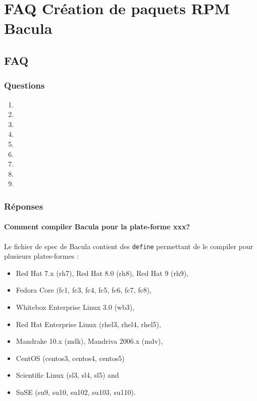 

\chapter{FAQ Création de paquets RPM Bacula}
\label{RpmFaqChapter}

\section{FAQ}

\subsection{Questions}

\begin{enumerate}
\item {}  
\item {}  
\item {}  
\item {}  
\item {} 
\item {} 
\item {}
\item {}  
\item {}  
\end{enumerate}

\subsection{Réponses}
   
   \subsubsection{Comment compiler Bacula pour la plate-forme xxx?}
   Le fichier de spec de Bacula contient des \texttt{define} permettant de le 
   compiler pour plusieurs plates-formes :
   \begin{itemize}
   \item Red Hat 7.x (rh7), Red Hat 8.0 (rh8), Red Hat 9 (rh9),
   \item Fedora Core (fc1, fc3, fc4, fc5, fc6, fc7, fc8),
   \item Whitebox Enterprise Linux 3.0 (wb3),
   \item Red Hat Enterprise Linux (rhel3, rhel4, rhel5),
   \item Mandrake 10.x (mdk), Mandriva 2006.x (mdv), 
   \item CentOS (centos3, centos4, centos5) 
   \item Scientific Linux (sl3, sl4, sl5) and
   \item SuSE (su9, su10, su102, su103, su110).
   \end{itemize}
   
